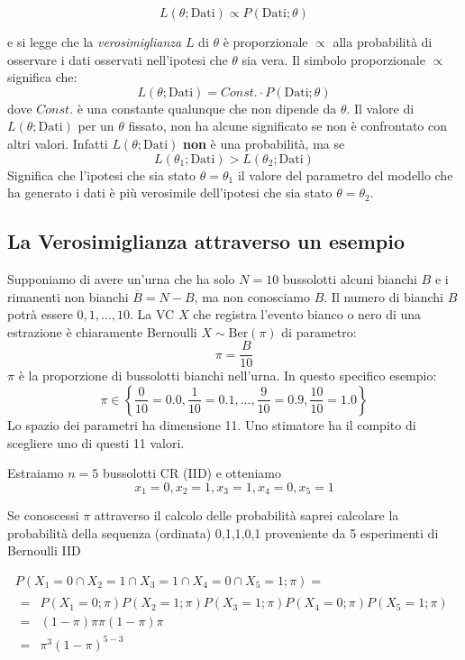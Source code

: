 \documentclass[
  11pt,
]{book}
\theoremstyle{mytheoremstyle}
\theoremstyle{mydefstyle}
\begin{document}
\begin{info}
\[
L(\theta;\text{Dati})\propto P(\text{Dati};\theta)
\]

\end{info}

e si legge che la \emph{verosimiglianza} \(L\) di \(\theta\) è proporzionale \(\propto\) alla
probabilità di osservare i dati osservati nell'ipotesi che \(\theta\) sia vera.
Il simbolo proporzionale \(\propto\) significa che:
\[
L(\theta;\text{Dati})=Const.\cdot P(\text{Dati};\theta)
\]
dove \(Const.\) è una constante qualunque che non dipende da \(\theta\).
Il valore di \(L(\theta;\text{Dati})\) per un \(\theta\) fissato, non ha alcune significato
se non è confrontato con altri valori. Infatti \(L(\theta;\text{Dati})\) \textbf{non} è una
probabilità, ma se
\[
L(\theta_1;\text{Dati})> L(\theta_2;\text{Dati})
\]
Significa che l'ipotesi che sia stato \(\theta=\theta_1\) il valore del parametro del
modello che ha generato i dati è più verosimile dell'ipotesi che sia
stato \(\theta=\theta_2\).

\subsection{La Verosimiglianza attraverso un esempio}\label{la-verosimiglianza-attraverso-un-esempio}

Supponiamo di avere un'urna che ha solo \(N=10\) bussolotti alcuni bianchi \(B\) e i rimanenti non bianchi \(\overline{B}=N-B\), ma non conosciamo \(B\).
Il numero di bianchi \(B\) potrà essere \(0, 1,...,10\).
La VC \(X\) che registra l'evento bianco o nero di una estrazione è chiaramente Bernoulli \(X\sim\text{Ber}(\pi)\) di parametro:
\[\pi=\frac B {10}\]
\(\pi\) è la proporzione di bussolotti bianchi nell'urna.
In questo specifico esempio:
\[\pi\in\left\{\frac 0{10}=0.0,\frac{1}{10}=0.1,...,\frac 9 {10}=0.9,\frac{10}{10}=1.0\right\}\]
Lo spazio dei parametri ha dimensione 11.
Uno stimatore ha il compito di scegliere uno di questi 11 valori.

Estraiamo \(n=5\) bussolotti CR (IID) e otteniamo
\[x_1=0,x_2=1,x_3=1,x_4=0,x_5=1\]

Se conoscessi \(\pi\) attraverso il calcolo delle probabilità saprei calcolare la
probabilità della sequenza (ordinata) 0,1,1,0,1 proveniente da 5 esperimenti di
Bernoulli IID

\begin{multline*}
P(X_1=0\cap X_2=1 \cap X_3=1 \cap X_4=0\cap X_5=1;\pi) = \\
\begin{array}{ll}
  = &P(X_1=0;\pi)P(X_2=1;\pi)P(X_3=1;\pi)P(X_4=0;\pi)P(X_5=1;\pi)\\
  = &(1-\pi)\pi\pi(1-\pi)\pi\\
  = &\pi^3(1-\pi)^{5-3}
\end{array}
\end{multline*}
\end{document}
